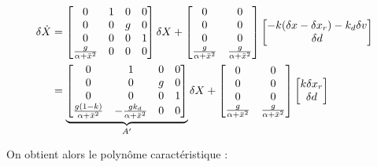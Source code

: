 \documentclass[10pt]{article}
\begin{document}
\begin{align}
\delta \dot X &=
	\begin{bmatrix}
		0 & 1 & 0 & 0 \\
		0 & 0 & g & 0 \\
		0 & 0 & 0 & 1 \\
		\frac{g}{\alpha + \bar x^2} & 0 & 0 & 0
	\end{bmatrix}
	\delta X
	+
	\begin{bmatrix}
		0 & 0 \\
		0 & 0 \\
		0 & 0 \\
		\frac{g}{\alpha + \bar x^2} & \frac{g}{\alpha + \bar x^2}
	\end{bmatrix}
	\begin{bmatrix}
		- k ( \delta x - \delta x_r ) - k_d \delta v \\ \delta d
	\end{bmatrix}
	\notag \\
	&= \underbrace{
	\begin{bmatrix}
		0 & 1 & 0 & 0 \\
		0 & 0 & g & 0 \\
		0 & 0 & 0 & 1 \\
		\frac{g (1 - k)}{\alpha + \bar x^2} & - \frac{g k_d}{\alpha + \bar x^2} & 0 & 0
	\end{bmatrix}
	}_{A'}
	\delta X
	+
	\begin{bmatrix}
		0 & 0 \\
		0 & 0 \\
		0 & 0 \\
		\frac{g}{\alpha + \bar x^2} & \frac{g}{\alpha + \bar x^2}
	\end{bmatrix}
	\begin{bmatrix}
		k \delta x_r \\ \delta d
	\end{bmatrix}
	\notag
\end{align}

\noindent On obtient alors le polynôme caractéristique :
\end{document}
